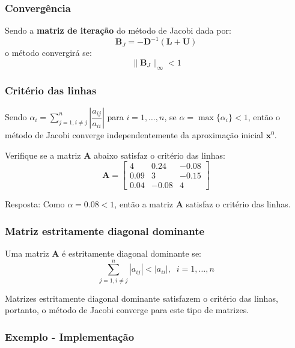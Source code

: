 \documentclass{beamer}
\theoremstyle{mystyle}
\begin{document}
\begin{frame}
	\frametitle{Convergência}
	Sendo a \textbf{matriz de iteração} do método de Jacobi dada por:
	\begin{equation*}
		  \mathbf{B}_{J} = - \mathbf{D}^{-1} \left( \mathbf{L} + \mathbf{U}\right)
	\end{equation*}
	o método convergirá se:
	\begin{equation*}
		\|\mathbf{B}_{J}\|_{\infty} < 1
	\end{equation*}
\end{frame}

\begin{frame}
	\frametitle{Critério das linhas}
	Sendo $ \alpha_{i} = \sum_{j=1, i\neq j}^{n} \left| \dfrac{a_{ij}}{a_{ii}}\right| $ para $ i = 1,\dots,n $, se $ \alpha = \max\{\alpha_{i}\} < 1 $, então o método de Jacobi converge independentemente da aproximação inicial $ \mathbf{x}^{0} $.
	
	Verifique se a matriz \textbf{A} abaixo satisfaz o critério das linhas:
	\begin{equation*}
		\mathbf{A} = \left[
		\begin{array}{ccc}
			4 & 0.24 & -0.08 \\
			0.09 & 3 & -0.15 \\
			0.04 & -0.08 & 4  
		\end{array}
		\right]
	\end{equation*}
	\pause
	
	Resposta: Como $ \alpha = 0.08 < 1 $, então a matriz \textbf{A} satisfaz o critério das linhas.
\end{frame}

\begin{frame}
	\frametitle{Matriz estritamente diagonal dominante}
	Uma matriz \textbf{A} é estritamente diagonal dominante se:
	\begin{equation*}
		\sum_{j=1, i\neq j}^{n} |a_{ij}| < |a_{ii}|, \;\; i = 1,\dots,n
	\end{equation*}
	
	Matrizes estritamente diagonal dominante satisfazem o critério das linhas, portanto, o método de Jacobi converge para este tipo de matrizes.
	
\end{frame}

\begin{frame}
	\frametitle{Exemplo - Implementação}
	\centering
	\href{https://colab.research.google.com/drive/1ctTIw4RQBe6uECS21G-Q7hSQEm_5a8ha?usp=sharing}{}
\end{frame}
\end{document}

